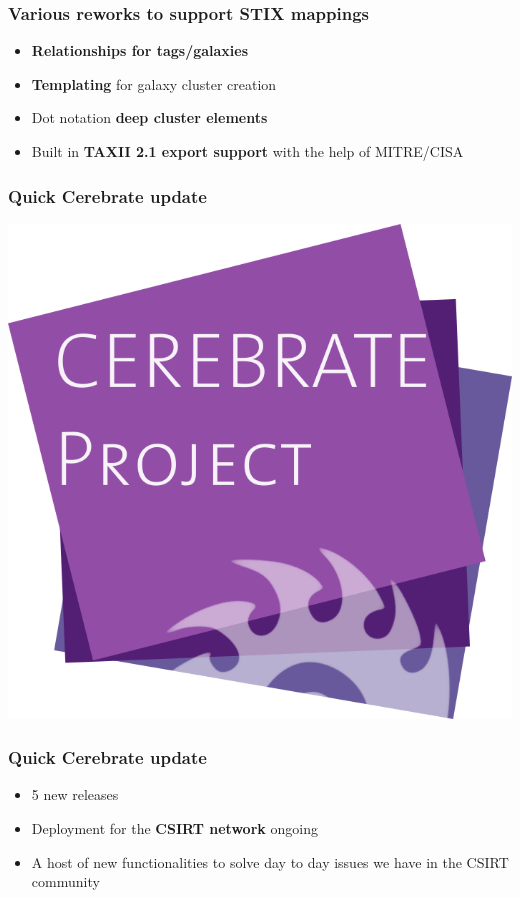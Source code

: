 \begin{frame}
  \frametitle{Various reworks to support STIX mappings}
  \begin{itemize}
     \item {\bf Relationships for tags/galaxies}
     \item {\bf Templating} for galaxy cluster creation
     \item Dot notation {\bf deep cluster elements}
     \item Built in {\bf TAXII 2.1 export support} with the help of MITRE/CISA
  \end{itemize}
\end{frame}

\begin{frame}
\frametitle{Quick Cerebrate update}
\begin{center}
\includegraphics[scale=0.4]{images/cerebrate.png}
\end{center}
\end{frame}

\begin{frame}
  \frametitle{Quick Cerebrate update}
  \begin{itemize}
     \item 5 new releases
     \item Deployment for the {\bf CSIRT network} ongoing
     \item A host of new functionalities to solve day to day issues we have in the CSIRT community
  \end{itemize}
\end{frame}

